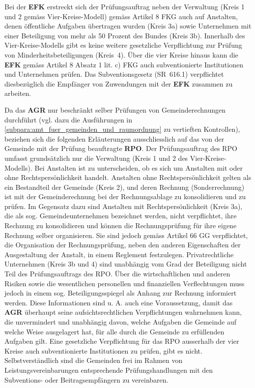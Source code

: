 \documentclass[10pt]{article}
\begin{document}
Bei der \textbf{EFK} erstreckt sich der Prüfungsauftrag neben der Verwaltung (Kreis 1 und 2 gemäss Vier-Kreise-Modell) gemäss Artikel 8 FKG auch auf Anstalten, denen öffentliche Aufgaben übertragen wurden (Kreis 3a) sowie Unternehmen mit einer Beteiligung von mehr als 50 Prozent des Bundes (Kreis 3b). Innerhalb des Vier-Kreise-Modells gibt es keine weitere gesetzliche Verpflichtung zur Prüfung von Minderheitsbeteiligungen (Kreis~4). Über die vier Kreise hinaus kann die \textbf{EFK} gemäss Artikel 8 Absatz 1 lit. c) FKG auch subventionierte Institutionen und Unternehmen prüfen. Das Subventionsgesetz (SR~616.1) verpflichtet diesbezüglich die Empfänger von Zuwendungen mit der \textbf{EFK} zusammen zu arbeiten.

Da das \textbf{AGR} nur beschränkt selber Prüfungen von Gemeinderechnungen durchführt (vgl. dazu die Ausführungen in \vref{subpara:amt_fuer_gemeinden_und_raumordnung} zu vertieften Kontrollen), beziehen sich die folgenden Erläuterungen ausschliesslich auf das von der Gemeinde mit der Prüfung beauftragte \textbf{RPO}. Der Prüfungsauftrag des RPO umfasst grundsätzlich nur die Verwaltung (Kreis 1 und 2 des Vier-Kreise-Modells). Bei Anstalten ist zu unterscheiden, ob es sich um Anstalten mit oder ohne Rechtspersönlichkeit handelt. Anstalten ohne Rechtspersönlichkeit gelten als ein Bestandteil der Gemeinde (Kreis 2), und deren Rechnung (Sonderrechnung) ist mit der Gemeinderechnung bei der Rechnungsablage zu konsolidieren und zu prüfen. Im Gegensatz dazu sind Anstalten mit Rechtspersönlichkeit (Kreis 3a), die als sog. Gemeindeunternehmen bezeichnet werden, nicht verpflichtet, ihre Rechnung zu konsolidieren und können die Rechnungsprüfung für ihre eigene Rechnung selber organisieren. Sie sind jedoch gemäss Artikel 66 GG verpflichtet, die Organisation der Rechnungsprüfung, neben den anderen Eigenschaften der Ausgestaltung der Anstalt, in einem Reglement festzulegen. Privatrechtliche Unternehmen (Kreis 3b und 4) sind unabhängig vom Grad der Beteiligung nicht Teil des Prüfungsauftrags des RPO. Über die wirtschaftlichen und anderen Risiken sowie die wesentlichen personellen und finanziellen Verflechtungen muss jedoch in einem sog. Beteiligungsspiegel als Anhang zur Rechnung informiert werden. Diese Informationen sind u. A. auch eine Voraussetzung, damit das \textbf{AGR} überhaupt seine aufsichtsrechtlichen Verpflichtungen wahrnehmen kann, die unvermindert und unabhängig davon, welche Aufgaben die Gemeinde auf welche Weise ausgelagert hat, für alle durch die Gemeinde zu erfüllenden Aufgaben gilt. Eine gesetzliche Verpflichtung für das RPO ausserhalb der vier Kreise auch subventionierte Institutionen zu prüfen, gibt es nicht. Selbstverständlich sind die Gemeinden frei im Rahmen von Leistungsvereinbarungen entsprechende Prüfungshandlungen mit den Subventions- oder Beitragsempfängern zu vereinbaren.
\end{document}

